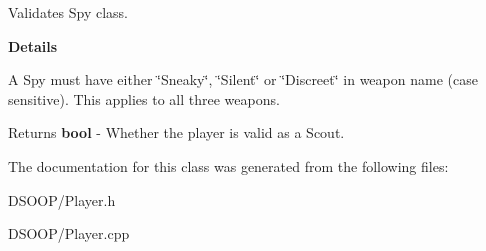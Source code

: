 Validates Spy class. 

{\bfseries Details}

A Spy must have either \char`\"{}\+Sneaky\char`\"{}, \char`\"{}\+Silent\char`\"{} or \char`\"{}\+Discreet\char`\"{} in weapon name (case sensitive). This applies to all three weapons.

\begin{DoxyReturn}{Returns}
{\bfseries bool} -\/ Whether the player is valid as a Scout. 
\end{DoxyReturn}


The documentation for this class was generated from the following files\+:\begin{DoxyCompactItemize}
\item 
D\+S\+O\+O\+P/Player.\+h\item 
D\+S\+O\+O\+P/Player.\+cpp\end{DoxyCompactItemize}
